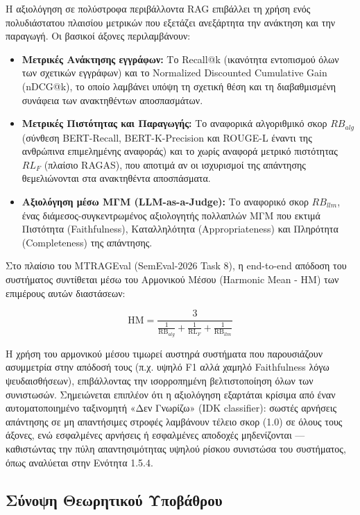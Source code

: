 Η αξιολόγηση σε πολύστροφα περιβάλλοντα RAG επιβάλλει τη χρήση ενός πολυδιάστατου πλαισίου μετρικών που εξετάζει ανεξάρτητα την ανάκτηση και την παραγωγή. Οι βασικοί άξονες περιλαμβάνουν:
\begin{itemize}
    \item \textbf{Μετρικές Ανάκτησης εγγράφων:} Το Recall@k (ικανότητα εντοπισμού όλων των σχετικών εγγράφων) και το Normalized Discounted Cumulative Gain (nDCG@k), το οποίο λαμβάνει υπόψη τη σχετική θέση και τη διαβαθμισμένη συνάφεια των ανακτηθέντων αποσπασμάτων.
    \item \textbf{Μετρικές Πιστότητας και Παραγωγής:} Το αναφορικά αλγοριθμικό σκορ $RB_{alg}$ (σύνθεση BERT-Recall, BERT-K-Precision και ROUGE-L έναντι της ανθρώπινα επιμελημένης αναφοράς) και το χωρίς αναφορά μετρικό πιστότητας $RL_F$ (πλαίσιο RAGAS), που αποτιμά αν οι ισχυρισμοί της απάντησης θεμελιώνονται στα ανακτηθέντα αποσπάσματα.
    \item \textbf{Αξιολόγηση μέσω ΜΓΜ (LLM-as-a-Judge):} Το αναφορικό σκορ $RB_{llm}$, ένας διάμεσος-συγκεντρωμένος αξιολογητής πολλαπλών ΜΓΜ που εκτιμά Πιστότητα (Faithfulness), Καταλληλότητα (Appropriateness) και Πληρότητα (Completeness) της απάντησης.
\end{itemize}

Στο πλαίσιο του MTRAGEval (SemEval-2026 Task 8), η end-to-end απόδοση του συστήματος συντίθεται μέσω του Αρμονικού Μέσου (Harmonic Mean - HM) των επιμέρους αυτών διαστάσεων:

\begin{equation}
\text{HM} = \frac{3}{\frac{1}{\text{RB}_{alg}} + \frac{1}{\text{RL}_F} + \frac{1}{\text{RB}_{llm}}}
\end{equation}

Η χρήση του αρμονικού μέσου τιμωρεί αυστηρά συστήματα που παρουσιάζουν ασυμμετρία στην απόδοσή τους (π.χ. υψηλό F1 αλλά χαμηλό Faithfulness λόγω ψευδαισθήσεων), επιβάλλοντας την ισορροπημένη βελτιστοποίηση όλων των συνιστωσών. Σημειώνεται επιπλέον ότι η αξιολόγηση εξαρτάται κρίσιμα από έναν αυτοματοποιημένο ταξινομητή «Δεν Γνωρίζω» (IDK classifier): σωστές αρνήσεις απάντησης σε μη απαντήσιμες στροφές λαμβάνουν τέλειο σκορ (1.0) σε όλους τους άξονες, ενώ εσφαλμένες αρνήσεις ή εσφαλμένες αποδοχές μηδενίζονται — καθιστώντας την πύλη απαντησιμότητας υψηλού ρίσκου συνιστώσα του συστήματος, όπως αναλύεται στην Ενότητα 1.5.4.

\subsection{Σύνοψη Θεωρητικού Υποβάθρου}

